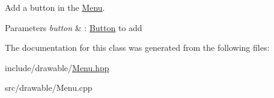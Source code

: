Add a button in the \hyperlink{classMenu}{Menu}. 


\begin{DoxyParams}{Parameters}
{\em button} & \+: \hyperlink{classButton}{Button} to add \\
\hline
\end{DoxyParams}


The documentation for this class was generated from the following files\+:\begin{DoxyCompactItemize}
\item 
include/drawable/\hyperlink{Menu_8hpp}{Menu.\+hpp}\item 
src/drawable/Menu.\+cpp\end{DoxyCompactItemize}
